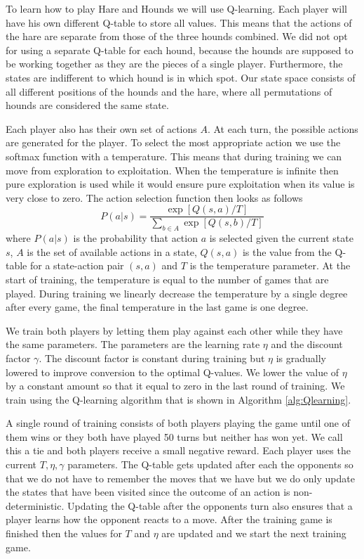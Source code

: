 To learn how to play Hare and Hounds we will use
Q-learning\cite{watkins1992q}.  Each player will have his own different
Q-table to store all values. This means that the actions of the hare are
separate from those of the three hounds combined. We did not opt for using
a separate Q-table for each hound, because the hounds are supposed to be
working together as they are the pieces of a single player. Furthermore,
the states are indifferent to which hound is in which spot. Our state space
consists of all different positions of the hounds and the hare, where all
permutations of hounds are considered the same state.

Each player also has their own set of actions $A$. At each turn, the possible
actions are generated for the player. To select the most appropriate action we
use  the softmax function with a temperature. This means that during training
we can move from exploration to exploitation. When the temperature is infinite
then  pure exploration is used while it would ensure pure exploitation when its
value is very close to zero. The action selection function then looks as
follows
\[ P(a|s) = \frac{\exp[Q(s,a)/T]}{\sum_{b \in A} \exp[Q(s, b)/T]} \]
where $P(a|s)$ is the probability that action $a$ is selected given the
current state $s$, $A$ is the set of available actions in a state, $Q(s,a)$ is
the value from the Q-table for a state-action pair $(s,a)$ and $T$ is the
temperature parameter. At the start of training, the temperature is equal to
the number of games that are played. During training we linearly decrease the
temperature by a single degree after every game, the final temperature in the
last game is one degree.

We train both players by letting them play against each other while they have
the same parameters. The parameters are the learning rate $\eta$ and the
discount factor $\gamma$. The discount factor is constant during training but
$\eta$ is gradually lowered to improve conversion to the optimal
Q-values\cite{alpaydin}. We lower the value of $\eta$ by a constant amount so
that it equal to zero in the last round of training. We train using the
Q-learning algorithm that is shown in Algorithm \autoref{alg:Qlearning}.

A single round of training consists of both players playing the game until one
of them wins or they both have played 50 turns but neither has won yet. We call
this a tie and both players receive a small negative reward. Each player uses
the current $T, \eta, \gamma$ parameters. The Q-table gets updated after each
the opponents so that we do not have to remember the moves that we have but we
do only update the states that have been visited since the outcome of an action
is non-deterministic. Updating the Q-table after the opponents turn also
ensures that a player learns how the opponent reacts to a move. After the
training game is finished then the values for $T$ and $\eta$ are updated and
we start the next training game.

